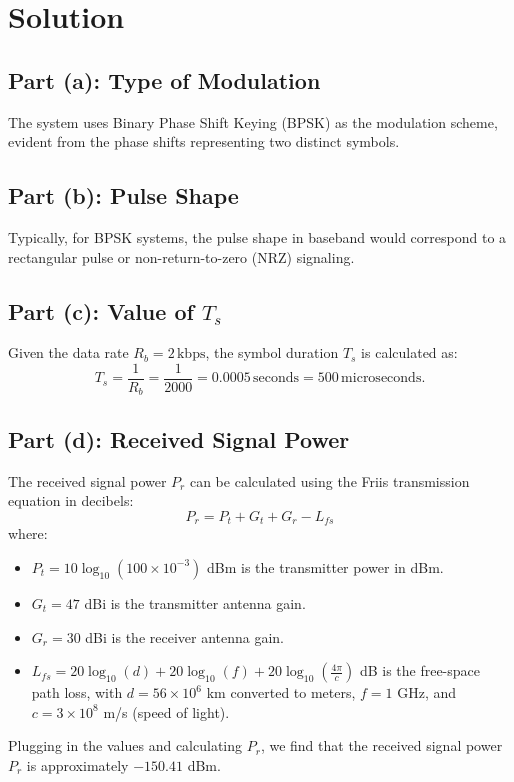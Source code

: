 \documentclass[12pt]{article}
\begin{document}
\section*{Solution}
\subsection*{Part (a): Type of Modulation}
The system uses Binary Phase Shift Keying (BPSK) as the modulation scheme, evident from the phase shifts representing two distinct symbols.

\subsection*{Part (b): Pulse Shape}
Typically, for BPSK systems, the pulse shape in baseband would correspond to a rectangular pulse or non-return-to-zero (NRZ) signaling.

\subsection*{Part (c): Value of $T_s$}
Given the data rate $R_b = 2\, \text{kbps}$, the symbol duration $T_s$ is calculated as:
\[
T_s = \frac{1}{R_b} = \frac{1}{2000} = 0.0005\, \text{seconds} = 500\, \text{microseconds}.
\]

\subsection*{Part (d): Received Signal Power}
The received signal power \( P_r \) can be calculated using the Friis transmission equation in decibels:
\[
P_r = P_t + G_t + G_r - L_{fs}
\]
where:
\begin{itemize}
    \item \( P_t = 10 \log_{10}(100 \times 10^{-3}) \) dBm is the transmitter power in dBm.
    \item \( G_t = 47 \) dBi is the transmitter antenna gain.
    \item \( G_r = 30 \) dBi is the receiver antenna gain.
    \item \( L_{fs} = 20 \log_{10}(d) + 20 \log_{10}(f) + 20 \log_{10}(\frac{4\pi}{c}) \) dB is the free-space path loss, with \( d = 56 \times 10^6 \) km converted to meters, \( f = 1 \) GHz, and \( c = 3 \times 10^8 \) m/s (speed of light).
\end{itemize}
Plugging in the values and calculating \( P_r \), we find that the received signal power \( P_r \) is approximately \(-150.41\) dBm.
\end{document}
